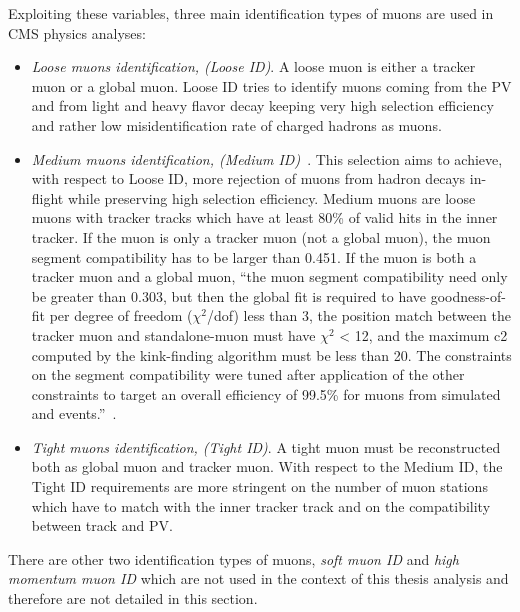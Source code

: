 Exploiting these variables, three main identification types of muons
are used in CMS physics analyses:
\begin{itemize}
\setlength\itemsep{-0.2em}
\item \emph{Loose muons identification, (Loose ID)}. A loose muon is either a
  tracker muon or a global muon. Loose ID tries to identify muons
  coming from the PV and from light and heavy flavor decay keeping
  very high selection efficiency and rather low misidentification rate
  of charged hadrons as muons. 
\item \emph{Medium muons identification, (Medium
    ID)}~\cite{PetruccianiBotta}. This selection aims to achieve, with
  respect to Loose ID, more rejection	
of muons from hadron decays in-flight while preserving
high selection efficiency. Medium muons are loose muons with tracker
tracks which have at least 80\% of valid hits in the inner tracker. 
If the muon is only a tracker muon (not a global muon), the muon
segment compatibility has to be larger than
0.451. If the muon is both a tracker muon and a global muon, ``the
muon segment compatibility need only be greater than 0.303, but then the global fit
is required to have goodness-of-fit per degree of freedom ($\chi^2$/dof) less than 3, the
position match between the tracker muon and standalone-muon must have $\chi^2$ < 12,
and the maximum c2 computed by the kink-finding algorithm must be less than 20.
The constraints on the segment compatibility were tuned after application of the
other constraints to target an overall efficiency of 99.5\% for muons from simulated
\PW and \PZ events.''~\cite{Sirunyan_2018_muon}.
\item \emph{Tight muons identification, (Tight ID)}. A tight muon must
  be reconstructed both as global muon and tracker muon. With respect
  to the Medium ID, the Tight ID requirements are more stringent on
  the number of muon stations which have to match with the inner
  tracker track and on the compatibility between track and PV. 
\end{itemize}
There are other two identification types of muons, \emph{soft muon ID}
and \emph{high momentum muon ID} which are not used in the context of
this thesis analysis and therefore are not detailed in this section. 

